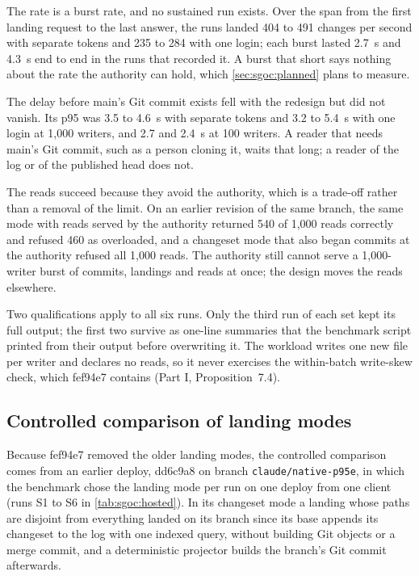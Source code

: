 \documentclass[11pt,letterpaper]{article}
\theoremstyle{definition}
\theoremstyle{remark}
\begin{document}
The rate is a burst rate, and no sustained run exists. Over the span from the first landing request to the last answer, the runs landed 404 to 491 changes per second with separate tokens and 235 to 284 with one login; each burst lasted 2.7~s and 4.3~s end to end in the runs that recorded it. %
A burst that short says nothing about the rate the authority can hold, which \cref{sec:sgoc:planned} plans to measure.

The delay before main's Git commit exists fell with the redesign but did not vanish. Its p95 was 3.5 to 4.6~s with separate tokens and 3.2 to 5.4~s with one login at 1,000 writers, and 2.7 and 2.4~s at 100 writers. %
A reader that needs main's Git commit, such as a person cloning it, waits that long; a reader of the log or of the published head does not.

The reads succeed because they avoid the authority, which is a trade-off rather than a removal of the limit. On an earlier revision of the same branch, the same mode with reads served by the authority returned 540 of 1,000 reads correctly and refused 460 as overloaded, and a changeset mode that also began commits at the authority refused all 1,000 reads. %
The authority still cannot serve a 1,000-writer burst of commits, landings and reads at once; the design moves the reads elsewhere.

Two qualifications apply to all six runs. Only the third run of each set kept its full output; the first two survive as one-line summaries that the benchmark script printed from their output before overwriting it. %
The workload writes one new file per writer and declares no reads, so it never exercises the within-batch write-skew check, which fef94e7 contains (Part I, Proposition~7.4).

\subsection{Controlled comparison of landing modes}
\label{sec:sgoc:changeset}

Because fef94e7 removed the older landing modes, the controlled comparison comes from an earlier deploy, dd6c9a8 on branch \nolinkurl{claude/native-p95e}, in which the benchmark chose the landing mode per run on one deploy from one client (runs S1 to S6 in \cref{tab:sgoc:hosted}). In its changeset mode a landing whose paths are disjoint from everything landed on its branch since its base appends its changeset to the log with one indexed query, without building Git objects or a merge commit, and a deterministic projector builds the branch's Git commit afterwards. %
\end{document}
